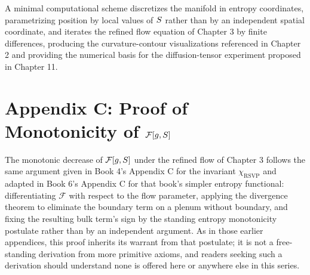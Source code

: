 A minimal computational scheme discretizes the manifold in entropy coordinates, parametrizing position by local values of $S$ rather than by an independent spatial coordinate, and iterates the refined flow equation of Chapter 3 by finite differences, producing the curvature-contour visualizations referenced in Chapter 2 and providing the numerical basis for the diffusion-tensor experiment proposed in Chapter 11.

\chapter*{Appendix C: Proof of Monotonicity of $\mathcal{F}[g,S]$}

The monotonic decrease of $\mathcal{F}[g,S]$ under the refined flow of Chapter 3 follows the same argument given in Book 4's Appendix C for the invariant $\chi_{\mathrm{RSVP}}$ and adapted in Book 6's Appendix C for that book's simpler entropy functional: differentiating $\mathcal{F}$ with respect to the flow parameter, applying the divergence theorem to eliminate the boundary term on a plenum without boundary, and fixing the resulting bulk term's sign by the standing entropy monotonicity postulate rather than by an independent argument. As in those earlier appendices, this proof inherits its warrant from that postulate; it is not a free-standing derivation from more primitive axioms, and readers seeking such a derivation should understand none is offered here or anywhere else in this series.

